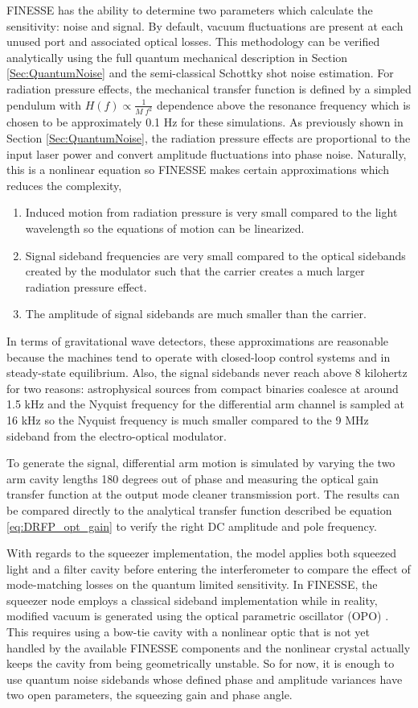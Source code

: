 	FINESSE has the ability to determine two parameters which calculate the sensitivity: noise and signal.  By default, vacuum fluctuations are present at each unused port and associated optical losses.  This methodology can be verified analytically using the full quantum mechanical description in Section \ref{Sec:QuantumNoise} and the semi-classical Schottky shot noise estimation.  For radiation pressure effects, the mechanical transfer function is defined by a simpled pendulum with $H(f) \propto \frac{1}{M \; f^2}$ dependence above the resonance frequency which is chosen to be approximately 0.1 Hz for these simulations.  As previously shown in Section \ref{Sec:QuantumNoise}, the radiation pressure effects are proportional to the input laser power and convert amplitude fluctuations into phase noise.  Naturally, this is a nonlinear equation so FINESSE makes certain approximations which reduces the complexity,
	\begin{enumerate}
		\item Induced motion from radiation pressure is very small compared to the light wavelength so the equations of motion can be linearized.
		\item Signal sideband frequencies are very small compared to the optical sidebands created by the modulator such that the carrier creates a much larger radiation pressure effect.
		\item The amplitude of signal sidebands are much smaller than the carrier.
	\end{enumerate}
	In terms of gravitational wave detectors, these approximations are reasonable because the machines tend to operate with closed-loop control systems and in steady-state equilibrium.  Also, the signal sidebands never reach above 8 kilohertz for two reasons: astrophysical sources from compact binaries coalesce at around 1.5 kHz and the Nyquist frequency for the differential arm channel is sampled at 16 kHz so the Nyquist frequency is much smaller compared to the 9 MHz sideband from the electro-optical modulator.  
	
	To generate the signal, differential arm motion is simulated by varying the two arm cavity lengths 180 degrees out of phase and measuring the optical gain transfer function at the output mode cleaner transmission port.  The results can be compared directly to the analytical transfer function described be equation \ref{eq:DRFP_opt_gain} to verify the right DC amplitude and pole frequency.
	
	With regards to the squeezer implementation, the model applies both squeezed light and a filter cavity before entering the interferometer to compare the effect of mode-matching losses on the quantum limited sensitivity.  In FINESSE, the squeezer node employs a classical sideband implementation while in reality, modified vacuum is generated using the optical parametric oscillator (OPO) \cite{GerryKnight}. This requires using a bow-tie cavity with a nonlinear optic that is not yet handled by the available FINESSE components and the nonlinear crystal actually keeps the cavity from being geometrically unstable. So for now, it is enough to use quantum noise sidebands whose defined phase and amplitude variances have two open parameters, the squeezing gain and phase angle. 
	
